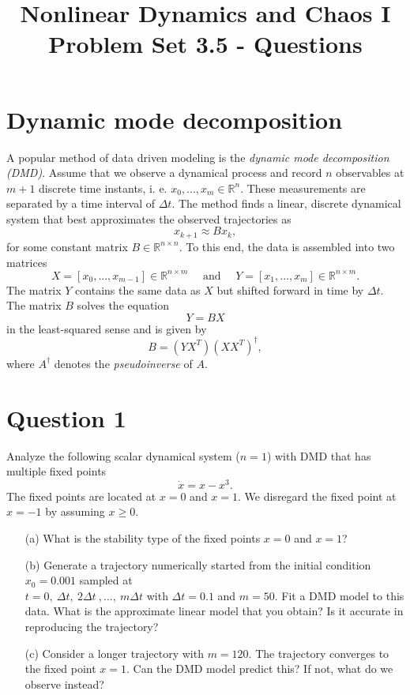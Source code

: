 \documentclass[twoside,10pt,a4paper]{article}
\title{\huge \textbf{Nonlinear Dynamics and Chaos I \\ \Large  Problem Set 3.5 - Questions}}	%
\author{ }		%
\date{ }	%
\begin{document}
\maketitle

\section*{Dynamic mode decomposition}
A popular method of data driven modeling is the {\em dynamic mode decomposition (DMD)}. Assume that we observe a dynamical process and record $n$ observables at $m+1$ discrete time instants, i. e. $x_0, ..., x_m \in \mathbb{R}^{n}$. These measurements are separated by a time interval of $\Delta t$. The method finds a linear, discrete dynamical system that best approximates the observed trajectories as 
$$
x_{k+1} \approx B x_k,
$$
for some constant matrix $B\in \mathbb{R}^{n \times n}$. 
To this end, the data is assembled into two matrices
$$X = [x_0, ..., x_{m-1}] \in \mathbb{R}^{n\times m} \quad \text{ and } \quad Y = [x_1, ..., x_{m}] \in \mathbb{R}^{n\times m}. $$
The matrix $Y$ contains the same data as $X$ but shifted forward in time by $\Delta t$. The matrix $B$ solves the equation
$$
Y = BX
$$
in the least-squared sense and is given by
$$
B = (YX^T)(XX^T)^\dagger,
$$
where $A^\dagger$ denotes the {\em pseudoinverse} of $A$. 
\section*{Question 1}
Analyze the following scalar dynamical system ($n=1$) with DMD that has multiple fixed points
$$
\dot{x} = x - x^3.
$$
The fixed points are located at $x=0$ and $x=1$. We disregard the fixed point at $x=-1$ by assuming $x\geq 0$.
\begin{enumerate}
\item[(a)] What is the stability type of the fixed points $x=0$ and $x=1$?
\item[(b)] Generate a trajectory numerically started from the initial condition $x_0 = 0.001$ sampled at  \\ $t= 0,\  \Delta t, \ 2\Delta t \ , ..., \ m \Delta t$ with $\Delta t= 0.1$ and $m = 50$. Fit a DMD model to this data. What is the approximate linear model that you obtain? Is it accurate in reproducing the trajectory?
\item[(c)] Consider a longer trajectory with $m = 120$. The trajectory converges to the fixed point $x=1$. Can the DMD model predict this? If not, what do we observe instead? 
\end{enumerate}
\end{document}

